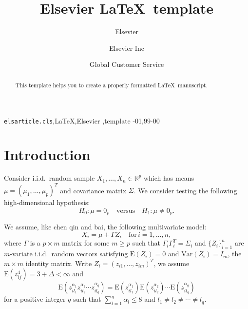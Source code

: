 \documentclass[review]{elsarticle}
\theoremstyle{plain}
\theoremstyle{definition}
\theoremstyle{remark}
\begin{document}
\begin{frontmatter}

\title{Elsevier \LaTeX\ template}

\author{Elsevier}
\address{Radarweg 29, Amsterdam}

\author[mymainaddress,mysecondaryaddress]{Elsevier Inc}

\author[mysecondaryaddress]{Global Customer Service}

\address[mymainaddress]{1600 John F Kennedy Boulevard, Philadelphia}
\address[mysecondaryaddress]{360 Park Avenue South, New York}

\begin{abstract}
This template helps you to create a properly formatted \LaTeX\ manuscript.
\end{abstract}

\begin{keyword}
\texttt{elsarticle.cls}\sep \LaTeX\sep Elsevier \sep template
-01\sep  99-00
\end{keyword}

\end{frontmatter}

\linenumbers


\section{Introduction}

Consider i.i.d.\ random sample $X_{1},\ldots,X_{n}\in \mathbb{R}^p$ which has means $\mu={(\mu_1,\ldots,\mu_p)}^T$ and covariance matrix $\Sigma$. We consider testing the following high-dimensional hypothesis:
\begin{equation}
    H_0:\mu=0_p\quad \textrm{versus} \quad H_1:\mu\neq 0_p.
\end{equation}

We assume, like chen qin and bai, the following multivariate model:
\begin{equation}
    X_i=\mu+\Gamma Z_i\quad \textrm{for}\, i=1,\ldots,n,
\end{equation}
where $\Gamma$ is a $p\times m$ matrix for some $m\geq p$ such that $\Gamma_i\Gamma_i^T=\Sigma_i$ and ${\{Z_{i}\}}_{i=1}^n$ are $m$-variate i.i.d.\ random vectors satisfying $\mathrm{E}(Z_i)=0$ and $\mathrm{Var}(Z_i)=I_m$, the $m\times m$ identity matrix. Write $Z_i={(z_{i1},\ldots,z_{im})}^T$, we assume $\mathrm{E}(z_{ij}^4)=3+\Delta<\infty$ and
\begin{equation}
    \mathrm{E}(z_{il_1}^{\alpha_1}z_{il_2}^{\alpha_2}\cdots z_{il_q}^{\alpha_q})=\mathrm{E}(z_{il_1}^{\alpha_1})\mathrm{E}(z_{il_2}^{\alpha_2})\cdots \mathrm{E}(z_{il_q}^{\alpha_q})
\end{equation}
for a positive integer $q$ such that $\sum_{l=1}^q \alpha_l\leq 8$ and $l_1\neq l_2\neq \cdots \neq l_q$.
\end{document}
